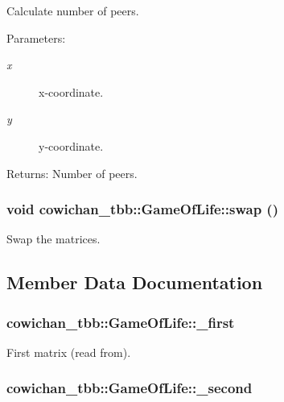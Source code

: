 Calculate number of peers. \begin{Desc}
\item[Parameters:]
\begin{description}
\item[{\em x}]x-coordinate. \item[{\em y}]y-coordinate. \end{description}
\end{Desc}
\begin{Desc}
\item[Returns:]Number of peers. \end{Desc}
\hypertarget{classcowichan__tbb_1_1_game_of_life_36367ee9491f53e457b6c3f728046f3b}{
\subsubsection[{swap}]{\setlength{\rightskip}{0pt plus 5cm}void cowichan\_\-tbb::GameOfLife::swap ()}}
\label{classcowichan__tbb_1_1_game_of_life_36367ee9491f53e457b6c3f728046f3b}


Swap the matrices. 

\subsection{Member Data Documentation}
\hypertarget{classcowichan__tbb_1_1_game_of_life_2a78cdb68396003c0963ac3ef5526370}{
\subsubsection[{\_\-first}]{ {\bf cowichan\_\-tbb::GameOfLife::\_\-first}}}
\label{classcowichan__tbb_1_1_game_of_life_2a78cdb68396003c0963ac3ef5526370}


First matrix (read from). \hypertarget{classcowichan__tbb_1_1_game_of_life_4b7e727ef2859168cafc1fa144e5255e}{
\subsubsection[{\_\-second}]{ {\bf cowichan\_\-tbb::GameOfLife::\_\-second}}}
\label{classcowichan__tbb_1_1_game_of_life_4b7e727ef2859168cafc1fa144e5255e}


